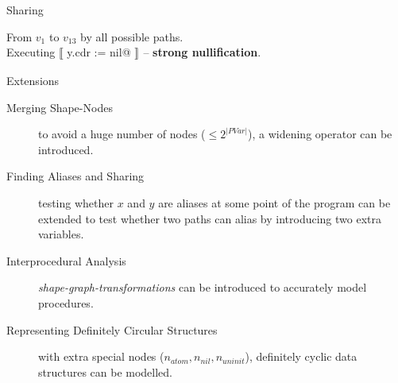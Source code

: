 \documentclass[xcolor={usenames,dvipsnames}]{beamer}
\makeatletter
\newcommand{\transformer}[2]{$\llbracket$ \lstinline@#1@
  $\rrbracket_{\mathcal{#2}}$}
\makeatother
\begin{document}
\begin{frame}[fragile]{Sharing}
{  From $v_1$ to $v_{13}$ by all possible paths. \\
  Executing \transformer{y.cdr := nil}{} -- \textbf{strong nullification}.

  \begin{center}
  \end{center}
  }
\end{frame}

\begin{frame}[fragile]{Extensions}
  \begin{description}
  \item[Merging Shape-Nodes] to avoid a huge number of nodes ($\leq 2^{|PVar|}$), a widening operator can be introduced.
  \item[Finding Aliases and Sharing] testing whether $x$ and $y$ are aliases at some point of the program can be extended to test whether two paths can alias by introducing two extra variables.
  \item[Interprocedural Analysis] \textit{shape-graph-transformations} can be introduced to accurately model procedures.
  \item[Representing Definitely Circular Structures] with extra special nodes ($n_{atom}, n_{nil}, n_{uninit}$), definitely cyclic data structures can be modelled.
  \end{description}
\end{frame}
\end{document}
